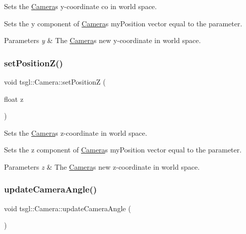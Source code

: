 Sets the \hyperlink{classtsgl_1_1_camera}{Camera}\textquotesingle{}s y-\/coordinate co in world space. 

Sets the y component of \hyperlink{classtsgl_1_1_camera}{Camera}\textquotesingle{}s my\+Position vector equal to the parameter. 
\begin{DoxyParams}{Parameters}
{\em y} & The \hyperlink{classtsgl_1_1_camera}{Camera}\textquotesingle{}s new y-\/coordinate in world space. \\
\hline
\end{DoxyParams}
\mbox{\label{classtsgl_1_1_camera_a87c83395dbde5a8fce49cba5200a0a5c}} 
\subsubsection{\texorpdfstring{set\+Position\+Z()}{setPositionZ()}}
{\footnotesize\ttfamily void tsgl\+::\+Camera\+::set\+PositionZ (\begin{DoxyParamCaption}\item[{float}]{z }\end{DoxyParamCaption})}



Sets the \hyperlink{classtsgl_1_1_camera}{Camera}\textquotesingle{}s z-\/coordinate in world space. 

Sets the z component of \hyperlink{classtsgl_1_1_camera}{Camera}\textquotesingle{}s my\+Position vector equal to the parameter. 
\begin{DoxyParams}{Parameters}
{\em z} & The \hyperlink{classtsgl_1_1_camera}{Camera}\textquotesingle{}s new z-\/coordinate in world space. \\
\hline
\end{DoxyParams}
\mbox{\label{classtsgl_1_1_camera_ac2daf561e3b110fe4ec17b23e530c01e}} 
\subsubsection{\texorpdfstring{update\+Camera\+Angle()}{updateCameraAngle()}}
{\footnotesize\ttfamily void tsgl\+::\+Camera\+::update\+Camera\+Angle (\begin{DoxyParamCaption}{ }\end{DoxyParamCaption})\hspace{0.3cm}{\ttfamily [protected]}}




